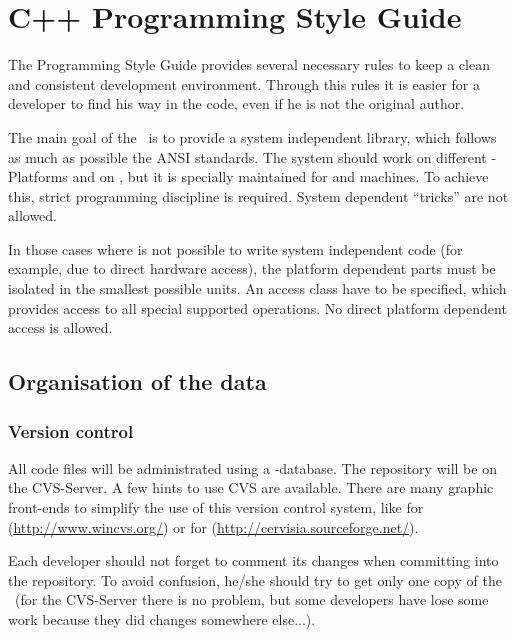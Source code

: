 \newcommand{\staticcast}{\code{static\_cast}}

\chapter{C++ Programming Style Guide}

The Programming Style Guide provides several necessary rules to keep a clean
and consistent development environment.  Through this rules it is easier for a
developer to find his way in the code, even if he is not the original author.

The main goal of the \ltilib\ is to provide a system independent library,
which follows as much as possible the ANSI standards.  The system should work
on different -Platforms and on , but it is
specially maintained for  and  machines.  To
achieve this, strict programming discipline is required.  System dependent
``tricks'' are not allowed.

In those cases where is not possible to write system independent code (for
example, due to direct hardware access), the platform dependent parts must be
isolated in the smallest possible units.  An access class have to be
specified, which provides access to all special supported operations.  No
direct platform dependent access is allowed.

\section{Organisation of the data}

\subsection{Version control}

 All code files will be administrated using a
-database.  The repository will be on the CVS-Server.  A few
hints to use CVS are available.  There are many graphic front-ends to simplify
the use of this version control system, like  for
 (\url{http://www.wincvs.org/}) or  for
 (\url{http://cervisia.sourceforge.net/}).

Each developer should not forget to comment its changes when committing into
the repository.  To avoid confusion, he/she should try to get only one copy of
the \ltilib\ (for the CVS-Server there is no problem, but some developers have
lose some work because they did changes somewhere else...).

